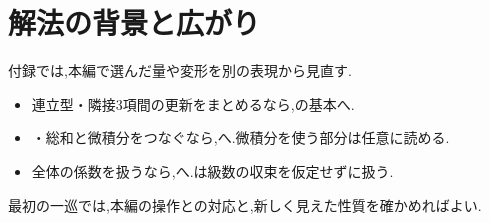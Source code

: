 
\chapter{解法の背景と広がり}\label{章：付録}
\begin{bookcolumns}

  付録では,本編で選んだ量や変形を別の表現から見直す.
  \begin{itemize}
    \item 連立型・隣接3項間の更新をまとめるなら,の基本へ.
    \item {}・総和と微積分をつなぐなら,へ.微積分を使う部分は任意に読める.
    \item {}全体の係数を扱うなら,へ.は級数の収束を仮定せずに扱う.
  \end{itemize}
  最初の一巡では,本編の操作との対応と,新しく見えた性質を確かめればよい.








\end{bookcolumns}
